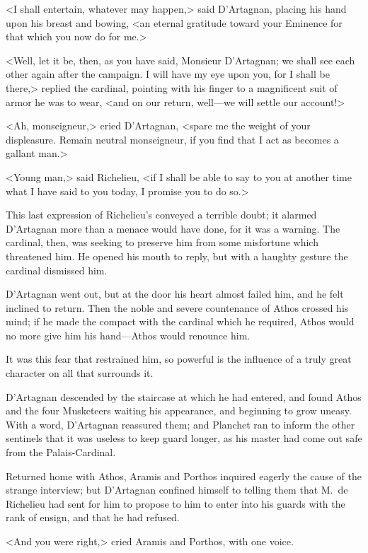 <I shall entertain, whatever may happen,> said D'Artagnan, placing his hand upon his breast and bowing, <an eternal gratitude toward your Eminence for that which you now do for me.> 

<Well, let it be, then, as you have said, Monsieur D'Artagnan; we shall see each other again after the campaign. I will have my eye upon you, for I shall be there,> replied the cardinal, pointing with his finger to a magnificent suit of armor he was to wear, <and on our return, well—we will settle our account!> 

<Ah, monseigneur,> cried D'Artagnan, <spare me the weight of your displeasure. Remain neutral monseigneur, if you find that I act as becomes a gallant man.> 

<Young man,> said Richelieu, <if I shall be able to say to you at another time what I have said to you today, I promise you to do so.> 

This last expression of Richelieu's conveyed a terrible doubt; it alarmed D'Artagnan more than a menace would have done, for it was a warning. The cardinal, then, was seeking to preserve him from some misfortune which threatened him. He opened his mouth to reply, but with a haughty gesture the cardinal dismissed him. 

D'Artagnan went out, but at the door his heart almost failed him, and he felt inclined to return. Then the noble and severe countenance of Athos crossed his mind; if he made the compact with the cardinal which he required, Athos would no more give him his hand—Athos would renounce him. 

It was this fear that restrained him, so powerful is the influence of a truly great character on all that surrounds it. 

D'Artagnan descended by the staircase at which he had entered, and found Athos and the four Musketeers waiting his appearance, and beginning to grow uneasy. With a word, D'Artagnan reassured them; and Planchet ran to inform the other sentinels that it was useless to keep guard longer, as his master had come out safe from the Palais-Cardinal. 

Returned home with Athos, Aramis and Porthos inquired eagerly the cause of the strange interview; but D'Artagnan confined himself to telling them that M.~de Richelieu had sent for him to propose to him to enter into his guards with the rank of ensign, and that he had refused. 

<And you were right,> cried Aramis and Porthos, with one voice. 


